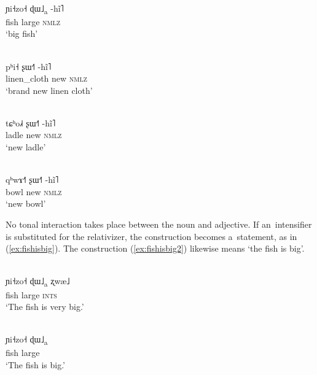 \begin{exe}
	\ex
	\label{ex:bigfish}
	\\
	\gll ɲi˧zo˧	ɖɯ˩\textsubscript{a}	-hĩ˥\\
	fish	large		\textsc{nmlz}\\
	\glt ‘big fish’
\end{exe}

\begin{exe}
	\ex
	\label{ex:newcloth}
	\\
	\gll pʰi˧	ʂɯ˧˥		-hĩ˥\\
	linen\_cloth		new		\textsc{nmlz}\\
	\glt ‘brand new linen cloth’
\end{exe}

\begin{exe}
	\ex
	\label{ex:newladle}
	\\
	\gll tɕʰo˩˧		ʂɯ˧˥		-hĩ˥\\
	ladle		new		\textsc{nmlz}\\
	\glt ‘new ladle’
\end{exe}

\begin{exe}
	\ex
	\label{ex:newbowl}
	\\
	\gll qʰwɤ˧˥		ʂɯ˧˥		-hĩ˥\\
	bowl		new		\textsc{nmlz}\\
	\glt ‘new bowl’
\end{exe}


No tonal interaction takes place between the noun and adjective. If an~intensifier is
substituted for the relativizer, the construction becomes a~statement, as in (\ref{ex:fishisbig}). The construction (\ref{ex:fishisbig2}) likewise means ‘the fish is big’.

\begin{exe}
	\ex
	\label{ex:fishisbig}
	\\
	\gll ɲi˧zo˧		ɖɯ˩\textsubscript{a}		ʐwæ˩\\
	fish		large		\textsc{ints}\\
	\glt ‘The fish is very big.’
\end{exe}

\begin{exe}
	\ex
	\label{ex:fishisbig2}
	\\
	\gll ɲi˧zo˧		ɖɯ˩\textsubscript{a}\\
	fish		large\\
	\glt ‘The fish is big.’
\end{exe}


